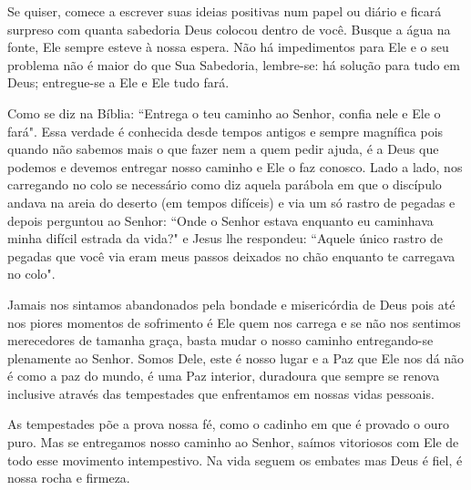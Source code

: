\emdash{}Se quiser, comece a escrever suas ideias positivas num papel ou diário e ficará surpreso com quanta sabedoria Deus colocou dentro de você. Busque a água na fonte, Ele sempre esteve à nossa espera. Não há impedimentos para Ele e o seu problema não é maior do que Sua Sabedoria, lembre-se: há solução para tudo em Deus; entregue-se a Ele e Ele tudo fará. 

\emdash{}Como se diz na Bíblia: ``Entrega o teu caminho ao Senhor, confia nele e Ele o fará". Essa verdade é conhecida desde tempos antigos e sempre magnífica pois quando não sabemos mais o que fazer nem a quem pedir ajuda, é a Deus que podemos e devemos entregar nosso caminho e Ele o faz conosco. Lado a lado, nos carregando no colo se necessário como diz aquela parábola em que o discípulo andava na areia do deserto (em tempos difíceis) e via um só rastro de pegadas e depois perguntou ao Senhor:  ``Onde o Senhor estava enquanto eu caminhava minha difícil estrada da vida?" e Jesus lhe respondeu: ``Aquele único rastro de pegadas que você via eram meus passos deixados no chão enquanto te carregava no colo".

\emdash{}Jamais nos sintamos abandonados pela bondade e misericórdia de Deus pois até nos piores momentos de sofrimento é Ele quem nos carrega e se não nos sentimos merecedores de tamanha graça, basta mudar o nosso caminho entregando-se plenamente ao Senhor. Somos Dele, este é nosso lugar e a Paz que Ele nos dá não é como a paz do mundo, é uma Paz interior, duradoura que sempre se renova inclusive através das tempestades que enfrentamos em nossas vidas pessoais.

\emdash{}As tempestades põe a prova nossa fé, como o cadinho em que é provado o ouro puro. Mas se entregamos nosso caminho ao Senhor, saímos vitoriosos com Ele de todo esse movimento intempestivo. Na vida seguem os embates mas Deus é fiel, é nossa rocha e firmeza.